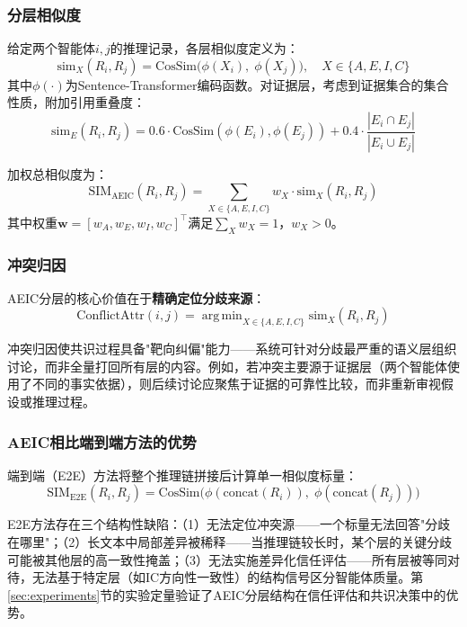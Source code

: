 \documentclass[12pt,a4paper,UTF8,fontset=fandol]{ctexart}
\DeclareMathOperator*{\argmin}{arg\,min}
\begin{document}
\subsubsection{分层相似度}

给定两个智能体$i, j$的推理记录，各层相似度定义为：
\begin{equation}
\text{sim}_X(R_i, R_j) = \text{CosSim}\bigl(\phi(X_i),\; \phi(X_j)\bigr), \quad X \in \{A, E, I, C\}
\end{equation}
其中$\phi(\cdot)$为Sentence-Transformer编码函数。对证据层，考虑到证据集合的集合性质，附加引用重叠度：
\begin{equation}
\text{sim}_E(R_i, R_j) = 0.6 \cdot \text{CosSim}(\phi(E_i), \phi(E_j)) + 0.4 \cdot \frac{|E_i \cap E_j|}{|E_i \cup E_j|}
\end{equation}

加权总相似度为：
\begin{equation}\label{eq:sim_aeic}
\text{SIM}_{\text{AEIC}}(R_i, R_j) = \sum_{X \in \{A,E,I,C\}} w_X \cdot \text{sim}_X(R_i, R_j)
\end{equation}
其中权重$\mathbf{w} = [w_A, w_E, w_I, w_C]^\top$满足$\sum_X w_X = 1$，$w_X > 0$。

\subsubsection{冲突归因}

AEIC分层的核心价值在于\textbf{精确定位分歧来源}：
\begin{equation}
\text{ConflictAttr}(i, j) = \argmin_{X \in \{A,E,I,C\}} \text{sim}_X(R_i, R_j)
\end{equation}

冲突归因使共识过程具备"靶向纠偏"能力——系统可针对分歧最严重的语义层组织讨论，而非全量打回所有层的内容。例如，若冲突主要源于证据层（两个智能体使用了不同的事实依据），则后续讨论应聚焦于证据的可靠性比较，而非重新审视假设或推理过程。

\subsubsection{AEIC相比端到端方法的优势}

端到端（E2E）方法将整个推理链拼接后计算单一相似度标量：
\begin{equation}
\text{SIM}_{\text{E2E}}(R_i, R_j) = \text{CosSim}\bigl(\phi(\text{concat}(R_i)),\; \phi(\text{concat}(R_j))\bigr)
\end{equation}

E2E方法存在三个结构性缺陷：（1）无法定位冲突源——一个标量无法回答"分歧在哪里"；（2）长文本中局部差异被稀释——当推理链较长时，某个层的关键分歧可能被其他层的高一致性掩盖；（3）无法实施差异化信任评估——所有层被等同对待，无法基于特定层（如IC方向性一致性）的结构信号区分智能体质量。第\ref{sec:experiments}节的实验定量验证了AEIC分层结构在信任评估和共识决策中的优势。
\end{document}
